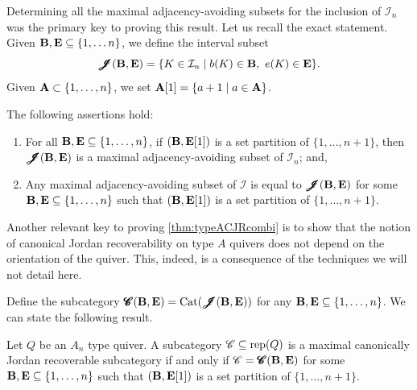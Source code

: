 Determining all the maximal adjacency-avoiding subsets for the inclusion of $\mathcal{I}_n$ was the primary key to proving this result. Let us recall the exact statement. Given $\mathbf B, \mathbf E \subseteq \{1,\ldots n\}$, we define the interval subset \[\operatorname{\pmb{\mathscr{J}}}(\mathbf B,\mathbf E) = \{K \in \mathcal{I}_n \mid b(K) \in \mathbf B,\ e(K) \in \mathbf E\}.\] Given $\mathbf A \subset\{1,\ldots,n\}$, we set $\mathbf A[1] = \{a+1 \mid a \in \mathbf A\}$.

\begin{prop} \label{prop:allmaxadjavo} The following assertions hold:
    \begin{enumerate}[label = $(\roman*)$,itemsep=1mm]
        \item For all $\mathbf B,\mathbf E \subseteq \{1,\ldots,n\}$, if $(\mathbf B,\mathbf E[1])$ is a set partition of $\{1,\ldots,n+1\}$, then $\operatorname{\pmb{\mathscr{J}}}(\mathbf B,\mathbf E)$ is a maximal adjacency-avoiding subset of $\mathcal{I}_n$; and,
        \item Any maximal adjacency-avoiding subset of $\mathcal{I}$ is equal to $\operatorname{\pmb{\mathscr{J}}}(\mathbf B,\mathbf E)$ for some $\mathbf B,\mathbf E \subseteq \{1,\ldots,n\}$ such that $(\mathbf B,\mathbf E[1])$ is a set partition of $\{1,\ldots,n+1\}$.
    \end{enumerate}
\end{prop}

Another relevant key to proving \cref{thm:typeACJRcombi} is to show that the notion of canonical Jordan recoverability on type $A$ quivers does not depend on the orientation of the quiver. This, indeed, is a consequence of the techniques we will not detail here.

Define the subcategory $\operatorname{\pmb{\mathscr{C}}}(\mathbf B,\mathbf E) = \operatorname{Cat}(\operatorname{\pmb{\mathscr{J}}}(\mathbf B,\mathbf E))$ for any $\mathbf B,\mathbf E \subseteq \{1,\ldots,n\}$. We can state the following result. 

\begin{theorem} \label{thm:CJRmaxcomb}
    Let $Q$ be an $A_n$ type quiver. A subcategory $\mathscr{C} \subseteq \operatorname{rep}(Q)$ is a maximal canonically Jordan recoverable subcategory if and only if $\mathscr{C} = \operatorname{\pmb{\mathscr{C}}}(\mathbf B,\mathbf E)$ for some $\mathbf B,\mathbf E \subseteq \{1,\ldots,n\}$ such that $(\mathbf B,\mathbf E[1])$ is a set partition of $\{1,\ldots,n+1\}$.
\end{theorem}

